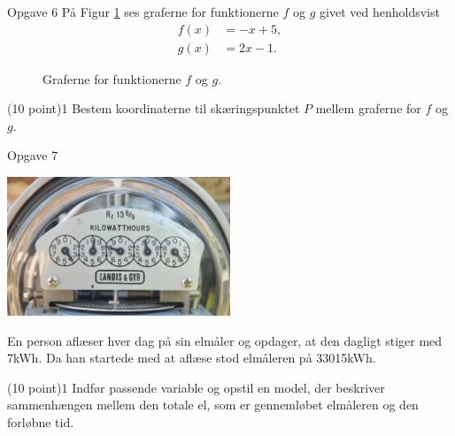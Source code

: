 \begin{opgavetekst}{Opgave 6}
	På Figur \ref{fig:twolines} ses graferne for funktionerne $f$ og $g$ givet ved henholdsvist 
	\begin{align*}
		f(x) &= -x+5,\\
		g(x) &= 2x-1.	
	\end{align*}	 
	\begin{figure}[H]
		\centering
		\caption{Graferne for funktionerne $f$ og $g$.}
		\label{fig:twolines}
	\end{figure}\phantom{h}
\end{opgavetekst}
\begin{delopgave}{(10 point)}{1}
	Bestem koordinaterne til skæringspunktet $P$ mellem graferne for $f$ og $g$. 
\end{delopgave}

\begin{opgavetekst}{Opgave 7}
	\begin{center}
		\includegraphics[width = 0.5\textwidth]{Billeder/el.jpg}
	\end{center}
	En person aflæser hver dag på sin elmåler og opdager, at den dagligt stiger med 7kWh. Da 
	han startede med at aflæse stod elmåleren på 33015kWh.
\end{opgavetekst}
\begin{delopgave}{(10 point)}{1}
	Indfør passende variable og opstil en model, der beskriver sammenhængen mellem den totale
	el, som er gennemløbet elmåleren og den forløbne tid. 
\end{delopgave}
